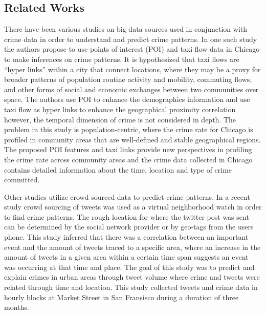 \documentclass{sigkddExp}
\begin{document}
\subsection{Related Works}
There have been various studies on big data sources used in conjunction with crime data in order to understand and predict crime patterns. In one such study \cite{Wang16} the authors propose to use points of interest (POI) and taxi flow data in Chicago to make inferences on crime patterns. It is hypothesized that taxi flows are “hyper links” within a city that connect locations, where they may be a proxy for broader patterns of population routine activity and mobility, commuting flows, and other forms of social and economic exchanges between two communities over space. The authors use POI to enhance the demographics information and use taxi flow as hyper links to enhance the geographical proximity correlation however, the temporal dimension of crime is not considered in depth. The problem in this study is population-centric, where the crime rate for Chicago is profiled in community areas that are well-defined and stable geographical regions. The proposed POI features and taxi links provide new perspectives in profiling the crime rate across community areas and the crime data collected in Chicago contains detailed information about the time, location and type of crime committed.

Other studies utilize crowd sourced data to predict crime patterns. In a recent study \cite{Bendler14} crowd sourcing of tweets was used as a virtual neighborhood watch in order to find crime patterns. The rough location for where the twitter post was sent can be determined by the social network provider or by geo-tags from the users phone. This study inferred that there was a correlation between an important event and the amount of tweets traced to a specific area, where an increase in the amount of tweets in a given area within a certain time span suggests an event was occurring at that time and place. The goal of this study was to predict and explain crimes in urban areas through tweet volume where crime and tweets were related through time and location. This study collected tweets and crime data in hourly blocks at Market Street in San Fransisco during a duration of three months. 
\end{document}
